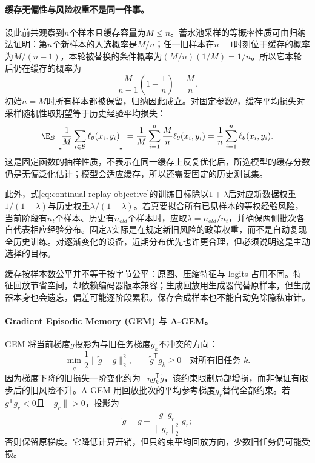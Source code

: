\paragraph{缓存无偏性与风险权重不是同一件事。}
设此前共观察到$n$个样本且缓存容量为$M\leq n$。蓄水池采样的等概率性质可由归纳法证明：第$n$个新样本的入选概率是$M/n$；任一旧样本在$n-1$时刻位于缓存的概率为$M/(n-1)$，本轮被替换的条件概率为$(M/n)(1/M)=1/n$。所以它本轮后仍在缓存的概率为
\begin{equation}
 \frac{M}{n-1}\left(1-\frac1n\right)=\frac Mn.
\end{equation}
初始$n=M$时所有样本都被保留，归纳因此成立。对固定参数$\theta$，缓存平均损失对采样随机性取期望等于历史经验平均损失：
\begin{equation}
 \E_{\mathcal B}\left[\frac1M\sum_{i\in\mathcal B}\ell_\theta(x_i,y_i)\right]
 =\frac1M\sum_{i=1}^n\frac Mn\ell_\theta(x_i,y_i)
 =\frac1n\sum_{i=1}^n\ell_\theta(x_i,y_i).
\end{equation}
这是固定函数的抽样性质，不表示在同一缓存上反复优化后，所选模型的缓存分数仍是无偏泛化估计；模型会适应缓存，所以还需要固定的历史测试集。

此外，式\eqref{eq:continual-replay-objective}的训练目标除以$1+\lambda$后对应新数据权重$1/(1+\lambda)$与历史权重$\lambda/(1+\lambda)$。若真要拟合所有已见样本的等权经验风险，当前阶段有$n_t$个样本、历史有$n_{old}$个样本时，应取$\lambda=n_{old}/n_t$，并确保两侧批次各自代表相应经验分布。固定$\lambda$实际是在规定新旧风险的政策权重，而不是自动复现全历史训练。对逐渐变化的设备，近期分布优先也许更合理，但必须说明这是主动选择的目标。

缓存按样本数公平并不等于按字节公平：原图、压缩特征与 logits 占用不同。特征回放节省空间，却依赖编码器版本兼容；生成回放用生成器代替原样本，但生成器本身也会遗忘，偏差可能逐阶段累积\cite{shin2017replay}。保存合成样本也不能自动免除隐私审计。

\paragraph{Gradient Episodic Memory (GEM) 与 A-GEM。}
GEM 将当前梯度$g$投影为与旧任务梯度$g_k$不冲突的方向\cite{lopezpaz2017gem}：
\begin{equation}
 \min_{\tilde g}\frac12\|\tilde g-g\|_2^2,
 \qquad \tilde g^{\mathsf T}g_k\geq0\quad\text{对所有旧任务 }k.
\end{equation}
因为梯度下降的旧损失一阶变化约为$-\eta g_k^{\mathsf T}\tilde g$，该约束限制局部增损，而非保证有限步后的旧风险不升。A-GEM 用回放批次的平均参考梯度$g_r$替代全部约束\cite{chaudhry2019agem}。若$g^{\mathsf T}g_r<0$且$\|g_r\|>0$，投影为
\begin{equation}
 \tilde g=g-\frac{g^{\mathsf T}g_r}{\|g_r\|_2^2}g_r;
\end{equation}
否则保留原梯度。它降低计算开销，但只约束平均回放方向，少数旧任务仍可能受损。

